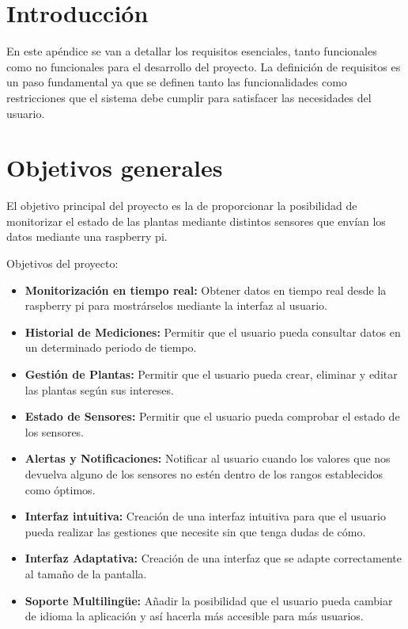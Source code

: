 
\section{Introducción}
En este apéndice se van a detallar los requisitos esenciales, tanto funcionales como no funcionales para el desarrollo del proyecto. La definición de requisitos es un paso fundamental ya que se definen tanto las funcionalidades como restricciones que el sistema debe cumplir para satisfacer las necesidades del usuario.

\section{Objetivos generales}
El objetivo principal del proyecto es la de proporcionar la posibilidad de monitorizar el estado de las plantas mediante distintos sensores que envían los datos mediante una raspberry pi.

Objetivos del proyecto:
    \begin{itemize}
        \item \textbf{Monitorización en tiempo real:} Obtener datos en tiempo real desde la raspberry pi para mostrárselos mediante la interfaz al usuario.
        \item \textbf{Historial de Mediciones:} Permitir que el usuario pueda consultar datos en un determinado periodo de tiempo.
        \item \textbf{Gestión de Plantas:} Permitir que el usuario pueda crear, eliminar y editar las plantas según sus intereses.
        \item \textbf{Estado de Sensores:} Permitir que el usuario pueda comprobar el estado de los sensores.
        \item \textbf{Alertas y Notificaciones:} Notificar al usuario cuando los valores que nos devuelva alguno de los sensores no estén dentro de los rangos establecidos como óptimos.
        \item \textbf{Interfaz intuitiva:} Creación de una interfaz intuitiva para que el usuario pueda realizar las gestiones que necesite sin que tenga dudas de cómo.
        \item \textbf{Interfaz Adaptativa:} Creación de una interfaz que se adapte correctamente al tamaño de la pantalla.
        \item \textbf{Soporte Multilingüe:} Añadir la posibilidad que el usuario pueda cambiar de idioma la aplicación y así hacerla más accesible para más usuarios.
    \end{itemize}


